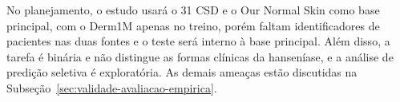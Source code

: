 No planejamento, o estudo usará o 31 CSD e o Our Normal Skin como base principal, com o Derm1M
apenas no treino, porém faltam identificadores de pacientes nas duas fontes e  o teste será interno à base principal.
Além disso, a tarefa é binária e não distingue as formas clínicas da hanseníase, e a
análise de predição seletiva é exploratória. As
demais ameaças estão discutidas na Subseção~\ref{sec:validade-avaliacao-empirica}.
